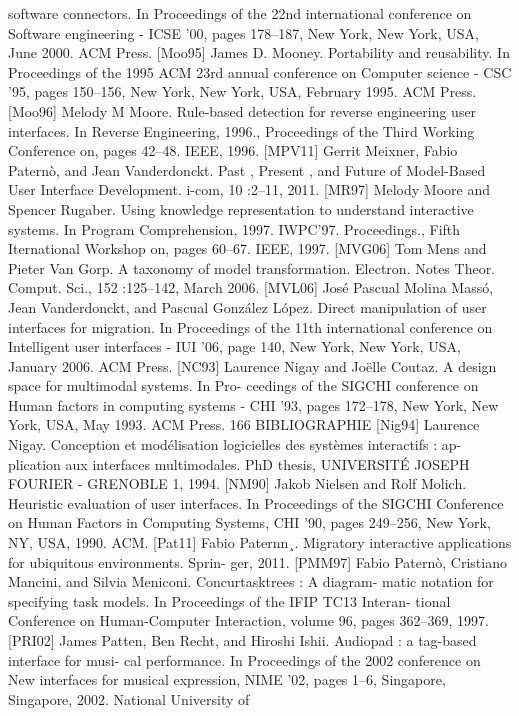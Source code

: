 \documentclass{article}
\begin{document}
software connectors. In Proceedings of the 22nd international conference on Software
engineering - ICSE ’00, pages 178–187, New York, New York, USA, June 2000. ACM
Press.
[Moo95]
James D. Mooney. Portability and reusability. In Proceedings of the 1995 ACM 23rd
annual conference on Computer science - CSC ’95, pages 150–156, New York, New
York, USA, February 1995. ACM Press.
[Moo96]
Melody M Moore. Rule-based detection for reverse engineering user interfaces. In
Reverse Engineering, 1996., Proceedings of the Third Working Conference on, pages
42–48. IEEE, 1996.
[MPV11]
Gerrit Meixner, Fabio Paternò, and Jean Vanderdonckt. Past , Present , and Future of
Model-Based User Interface Development. i-com, 10 :2–11, 2011.
[MR97]
Melody Moore and Spencer Rugaber. Using knowledge representation to understand
interactive systems. In Program Comprehension, 1997. IWPC’97. Proceedings., Fifth
Iternational Workshop on, pages 60–67. IEEE, 1997.
[MVG06]
Tom Mens and Pieter Van Gorp. A taxonomy of model transformation. Electron. Notes
Theor. Comput. Sci., 152 :125–142, March 2006.
[MVL06]
José Pascual Molina Massó, Jean Vanderdonckt, and Pascual González López. Direct
manipulation of user interfaces for migration. In Proceedings of the 11th international
conference on Intelligent user interfaces - IUI ’06, page 140, New York, New York,
USA, January 2006. ACM Press.
[NC93]
Laurence Nigay and Joëlle Coutaz. A design space for multimodal systems. In Pro-
ceedings of the SIGCHI conference on Human factors in computing systems - CHI ’93,
pages 172–178, New York, New York, USA, May 1993. ACM Press.
166
BIBLIOGRAPHIE
[Nig94]
Laurence Nigay. Conception et modélisation logicielles des systèmes interactifs : ap-
plication aux interfaces multimodales. PhD thesis, UNIVERSITÉ JOSEPH FOURIER
- GRENOBLE 1, 1994.
[NM90]
Jakob Nielsen and Rolf Molich. Heuristic evaluation of user interfaces. In Proceedings
of the SIGCHI Conference on Human Factors in Computing Systems, CHI ’90, pages
249–256, New York, NY, USA, 1990. ACM.
[Pat11]
Fabio Paternn¸. Migratory interactive applications for ubiquitous environments. Sprin-
ger, 2011.
[PMM97]
Fabio Paternò, Cristiano Mancini, and Silvia Meniconi. Concurtasktrees : A diagram-
matic notation for specifying task models. In Proceedings of the IFIP TC13 Interan-
tional Conference on Human-Computer Interaction, volume 96, pages 362–369, 1997.
[PRI02]
James Patten, Ben Recht, and Hiroshi Ishii. Audiopad : a tag-based interface for musi-
cal performance. In Proceedings of the 2002 conference on New interfaces for musical
expression, NIME ’02, pages 1–6, Singapore, Singapore, 2002. National University of
\end{document}
